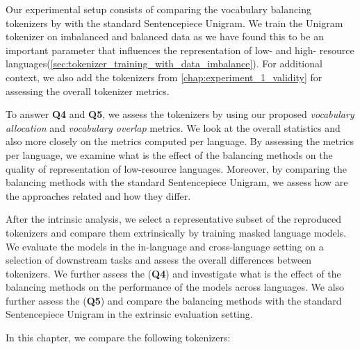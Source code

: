 
Our experimental setup consists of comparing the vocabulary balancing tokenizers by \citet{chung_improving_2020,zheng_allocating_2021,liang_xlm-v_2023} with the standard Sentencepiece Unigram. We train the Unigram tokenizer on imbalanced and balanced data as we have found this to be an important parameter that influences the representation of low- and high- resource languages(\autoref{sec:tokenizer_training_with_data_imbalance}). For additional context, we also add the tokenizers from \autoref{chap:experiment_1_validity} for assessing the overall tokenizer metrics.

To answer \textbf{Q4} and \textbf{Q5}, we assess the tokenizers by using our proposed \textit{vocabulary allocation} and \textit{vocabulary overlap} metrics. We look at the overall statistics and also more closely on the metrics computed per language. By assessing the metrics per language, we examine what is the effect of the balancing methods on the quality of representation of low-resource languages. Moreover, by comparing the balancing methods with the standard Sentencepiece Unigram, we assess how are the approaches related and how they differ.

After the intrinsic analysis, we select a representative subset of the reproduced tokenizers and compare them extrinsically by training masked language models. We evaluate the models in the in-language and cross-language setting on a selection of downstream tasks and assess the overall differences between tokenizers. We further assess the (\textbf{Q4}) and investigate what is the effect of the balancing methods on the performance of the models across languages. We also further assess the (\textbf{Q5}) and compare the balancing methods with the standard Sentencepiece Unigram in the extrinsic evaluation setting.

In this chapter, we compare the following tokenizers:

